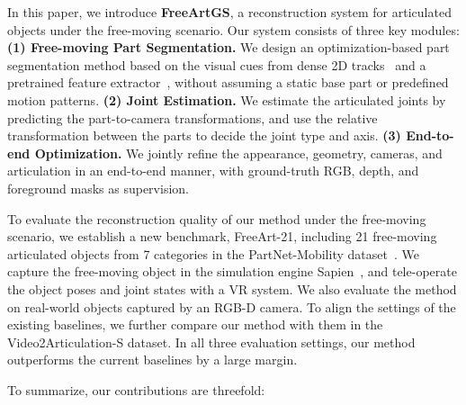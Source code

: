 In this paper, we introduce \textbf{FreeArtGS}, 
a reconstruction system for articulated objects under the free-moving scenario. 
Our system consists of three key modules: 
\textbf{(1) Free-moving Part Segmentation.} We design an optimization-based part segmentation method based on the visual cues from dense 2D tracks~\cite{alltracker} and a pretrained feature extractor~\cite{simeoni2025dinov3}, without assuming a static base part or predefined motion patterns.
\textbf{(2) Joint Estimation.} We estimate the articulated joints by predicting the part-to-camera transformations, and use the relative transformation between the parts to decide the joint type and axis.
\textbf{(3) End-to-end Optimization.} We jointly refine the appearance, geometry, cameras, and articulation in an end-to-end manner, with ground-truth RGB, depth, and foreground masks as supervision.


To evaluate the reconstruction quality of our method under the free-moving scenario, we establish a new benchmark, FreeArt-21, including 21 free-moving articulated objects from 7 categories in the PartNet-Mobility dataset~\cite{partnetmobility}. We capture the free-moving object in the simulation engine Sapien~\cite{partnetmobility}, and tele-operate the object poses and joint states with a VR system. We also evaluate the method on real-world objects captured by an RGB-D camera. To align the settings of the existing baselines, we further compare our method with them in the Video2Articulation-S dataset. In all three evaluation settings, our method outperforms the current baselines by a large margin. 



To summarize, our contributions are threefold:

